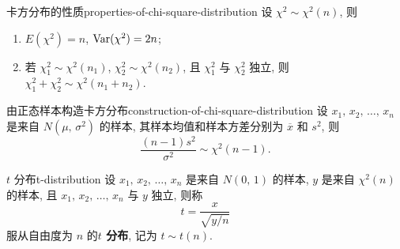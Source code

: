 \begin{newtheorembox}{卡方分布的性质}{properties-of-chi-square-distribution}
	设 $\chi^2\sim\chi^2(n)$, 则
	\begin{enumerate}
		\item $E(\chi^2)=n$, $\mathop{\mathrm{Var}}\nolimits(\chi^2)=2n$;
		\item 若 $\chi_1^2\sim\chi^2(n_1)$, $\chi_2^2\sim\chi^2(n_2)$, 且 $\chi_1^2$ 与 $\chi_2^2$ 独立, 则 $\chi_1^2+\chi_2^2\sim\chi^2(n_1+n_2)$.
	\end{enumerate}
\end{newtheorembox}

\begin{newtheorembox}{由正态样本构造卡方分布}{construction-of-chi-square-distribution}
	设 $x_1,\,x_2,\,\dots,\,x_n$ 是来自 $N(\mu,\,\sigma^2)$ 的样本, 其样本均值和样本方差分别为 $\overline{x}$ 和 $s^2$, 则
	\[
		\frac{(n-1)s^2}{\sigma^2}\sim\chi^2(n-1).
	\]
\end{newtheorembox}

\begin{newdefbox}{$t$ 分布}{t-distribution}
	设 $x_1,\,x_2,\,\dots,\,x_n$ 是来自 $N(0,\,1)$ 的样本, $y$ 是来自 $\chi^2(n)$ 的样本, 且 $x_1,\,x_2,\,\dots,\,x_n$ 与 $y$ 独立, 则称
	\[
		t=\frac{x}{\sqrt{y/n}}
	\]
	服从自由度为 $n$ 的\textbf{$t$ 分布}, 记为 $t\sim t(n)$.
\end{newdefbox}